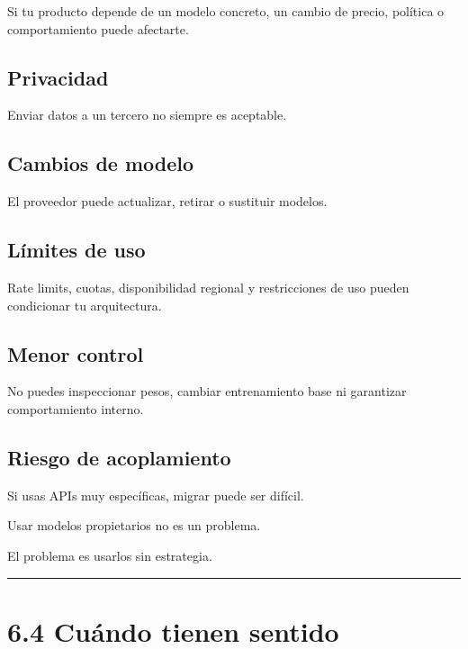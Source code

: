 Si tu producto depende de un modelo concreto, un cambio de precio,
política o comportamiento puede afectarte.

\subsection{Privacidad}\label{privacidad-3}

Enviar datos a un tercero no siempre es aceptable.

\subsection{Cambios de modelo}\label{cambios-de-modelo}

El proveedor puede actualizar, retirar o sustituir modelos.

\subsection{Límites de uso}\label{luxedmites-de-uso}

Rate limits, cuotas, disponibilidad regional y restricciones de uso
pueden condicionar tu arquitectura.

\subsection{Menor control}\label{menor-control}

No puedes inspeccionar pesos, cambiar entrenamiento base ni garantizar
comportamiento interno.

\subsection{Riesgo de acoplamiento}\label{riesgo-de-acoplamiento}

Si usas APIs muy específicas, migrar puede ser difícil.

Usar modelos propietarios no es un problema.

El problema es usarlos sin estrategia.

\begin{center}\rule{0.5\linewidth}{0.5pt}\end{center}

\section{6.4 Cuándo tienen sentido}\label{cuuxe1ndo-tienen-sentido}

